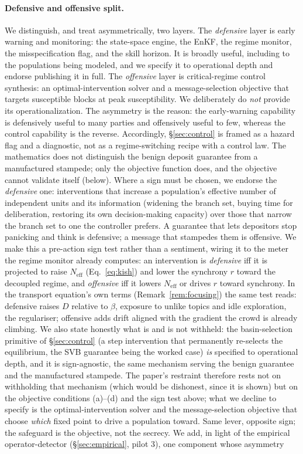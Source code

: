 \documentclass[11pt]{article}
\begin{document}
\paragraph{Defensive and offensive split.} We distinguish, and treat asymmetrically, two layers. The \emph{defensive} layer is early warning and monitoring: the state-space engine, the EnKF, the regime monitor, the misspecification flag, and the skill horizon. It is broadly useful, including to the populations being modeled, and we specify it to operational depth and endorse publishing it in full. The \emph{offensive} layer is critical-regime control synthesis: an optimal-intervention solver and a message-selection objective that targets susceptible blocks at peak susceptibility. We deliberately do \emph{not} provide its operationalization. The asymmetry is the reason: the early-warning capability is defensively useful to many parties and offensively useful to few, whereas the control capability is the reverse. Accordingly, \S\ref{sec:control} is framed as a hazard flag and a diagnostic, not as a regime-switching recipe with a control law. The mathematics does not distinguish the benign deposit guarantee from a manufactured stampede; only the objective function does, and the objective cannot validate itself (below). Where a sign must be chosen, we endorse the \emph{defensive} one: interventions that increase a population's effective number of independent units and its information (widening the branch set, buying time for deliberation, restoring its own decision-making capacity) over those that narrow the branch set to one the controller prefers. A guarantee that lets depositors stop panicking and think is defensive; a message that stampedes them is offensive. We make this a pre-action sign test rather than a sentiment, wiring it to the meter the regime monitor already computes: an intervention is \emph{defensive} iff it is projected to raise $N_{\mathrm{eff}}$ (Eq.~\eqref{eq:kish}) and lower the synchrony $r$ toward the decoupled regime, and \emph{offensive} iff it lowers $N_{\mathrm{eff}}$ or drives $r$ toward synchrony. In the transport equation's own terms (Remark~\ref{rem:focusing}) the same test reads: defensive raises $D$ relative to $\beta$, exposure to unlike topics and idle exploration, the regulariser; offensive adds drift aligned with the gradient the crowd is already climbing. We also state honestly what is and is not withheld: the basin-selection primitive of \S\ref{sec:control} (a step intervention that permanently re-selects the equilibrium, the SVB guarantee being the worked case) \emph{is} specified to operational depth, and it is sign-agnostic, the same mechanism serving the benign guarantee and the manufactured stampede. The paper's restraint therefore rests not on withholding that mechanism (which would be dishonest, since it is shown) but on the objective conditions (a)--(d) and the sign test above; what we decline to specify is the optimal-intervention solver and the message-selection objective that choose \emph{which} fixed point to drive a population toward. Same lever, opposite sign; the safeguard is the objective, not the secrecy. We add, in light of the empirical operator-detector (\S\ref{sec:empirical}, pilot 3), one component whose asymmetry 
\end{document}
